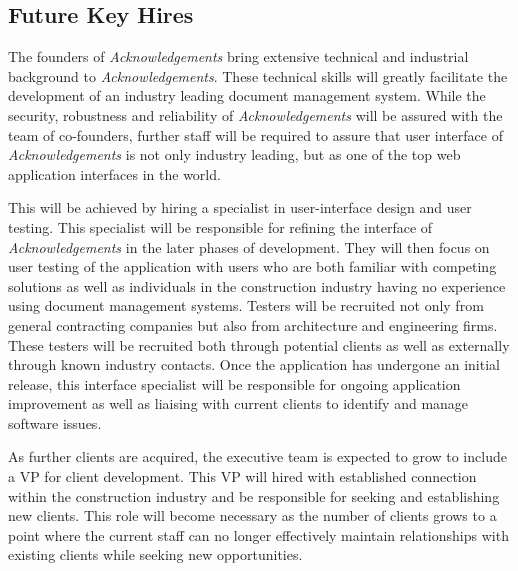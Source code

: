 \subsection{Future Key Hires}
The founders of {\it Acknowledgements} bring extensive technical and industrial background to {\it Acknowledgements}. These technical skills will greatly facilitate the development of an industry leading document management system. While the security, robustness and reliability of {\it Acknowledgements} will be assured with the team of co-founders, further staff will be required to assure that user interface of {\it Acknowledgements} is not only industry leading, but as one of the top web application interfaces in the world.

This will be achieved by hiring a specialist in user-interface design and user testing. This specialist will be responsible for refining the interface of {\it Acknowledgements} in the later phases of development. They will then focus on user testing of the application with users who are both familiar with competing solutions as well as individuals in the construction industry having no experience using document management systems. Testers will be recruited not only from general contracting companies but also from architecture and engineering firms. These testers will be recruited both through potential clients as well as externally through known industry contacts. Once the application has undergone an initial release, this interface specialist will be responsible for ongoing application improvement as well as liaising with current clients to identify and manage software issues.

As further clients are acquired, the executive team is expected to grow to include a VP for client development. This VP will hired with established connection within the construction industry and be responsible for seeking and establishing new clients. This role will become necessary as the number of clients grows to a point where the current staff can no longer effectively maintain relationships with existing clients while seeking new opportunities.